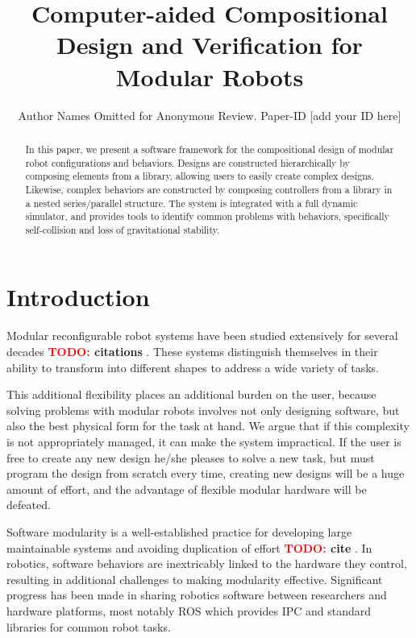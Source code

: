 \documentclass[conference]{IEEEtran}
\theoremstyle{definition}
\newcommand{\TODO}[1]{ {\bf \textcolor{red}{TODO:} #1 }}
\begin{document}
\title{Computer-aided Compositional Design and Verification for Modular Robots}

\author{Author Names Omitted for Anonymous Review. Paper-ID [add your ID here]}

\maketitle

\begin{abstract}
In this paper, we present a software framework for the compositional design of
modular robot configurations and behaviors. Designs are constructed
hierarchically by composing elements from a library, allowing users to easily
create complex designs.  Likewise, complex behaviors are constructed by
composing controllers from a library in a nested series/parallel structure. The
system is integrated with a full dynamic simulator, and provides tools to
identify common problems with behaviors, specifically self-collision and loss
of gravitational stability.

\end{abstract}

\section{Introduction}
Modular reconfigurable robot systems have been studied extensively for several
decades \TODO{citations}.  These systems distinguish themselves in their
ability to transform into different shapes to address a wide variety of tasks.

This additional flexibility places an additional burden on the user, because
solving problems with modular robots involves not only designing  software,
but also the best physical form for the task at hand. We argue that if this
complexity is not appropriately managed, it can make the system
impractical. If the user is free to create any new design he/she pleases to
solve a new task, but must program the design from scratch every time, creating
new designs will be a huge amount of effort, and the advantage of flexible modular
hardware will be defeated.

Software modularity is a well-established practice for developing large
maintainable systems and avoiding duplication of effort \TODO{cite}. In robotics, software
behaviors are inextricably linked to the hardware they control, resulting in
additional challenges to making modularity effective. Significant progress has been made in
sharing robotics software between researchers
and hardware platforms, most notably
ROS which provides IPC and standard libraries for common robot tasks. 
\end{document}
